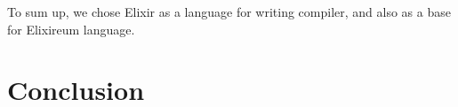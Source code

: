 To sum up, we chose Elixir as a language for writing compiler, and also as a base for Elixireum language.

\section{Conclusion}







